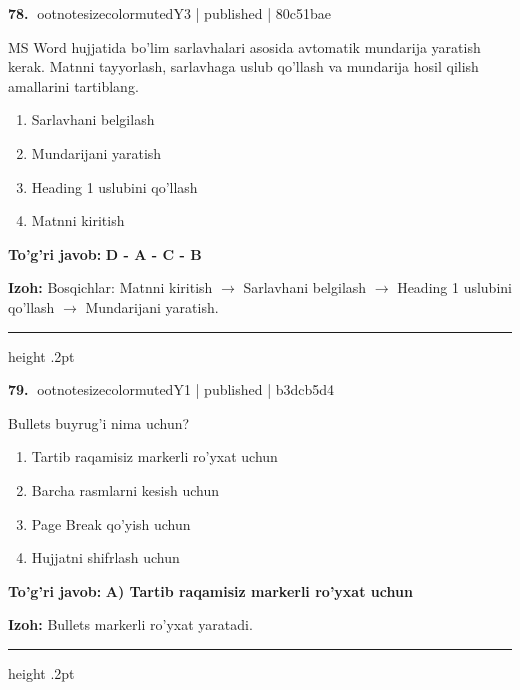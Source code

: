 \documentclass[10pt,a4paper]{article}
\begin{document}
\textbf{\color{ink}78.} {ootnotesizecolor{muted}Y3 | published | 80c51bae}
\par
MS Word hujjatida bo'lim sarlavhalari asosida avtomatik mundarija yaratish kerak. Matnni tayyorlash, sarlavhaga uslub qo'llash va mundarija hosil qilish amallarini tartiblang.
\begin{enumerate}[label=\Alph*),leftmargin=9mm]
\item Sarlavhani belgilash
\item Mundarijani yaratish
\item Heading 1 uslubini qo'llash
\item Matnni kiritish
\end{enumerate}
\begin{tcolorbox}[enhanced,breakable,colback=teal!4,colframe=teal!55!black,boxrule=0.45pt,arc=1.2mm,left=2.8mm,right=2.8mm,top=2mm,bottom=2mm]
\textbf{\color{teal}To'g'ri javob:} \textbf{D - A - C - B}
\par\smallskip
\textbf{Izoh:} Bosqichlar: Matnni kiritish \ensuremath{\rightarrow} Sarlavhani belgilash \ensuremath{\rightarrow} Heading 1 uslubini qo'llash \ensuremath{\rightarrow} Mundarijani yaratish.
\end{tcolorbox}
\vspace{2mm}\hrule height .2pt\vspace{2mm}

\textbf{\color{ink}79.} {ootnotesizecolor{muted}Y1 | published | b3dcb5d4}
\par
Bullets buyrug'i nima uchun?
\begin{enumerate}[label=\Alph*),leftmargin=9mm]
\item Tartib raqamisiz markerli ro'yxat uchun
\item Barcha rasmlarni kesish uchun
\item Page Break qo'yish uchun
\item Hujjatni shifrlash uchun
\end{enumerate}
\begin{tcolorbox}[enhanced,breakable,colback=teal!4,colframe=teal!55!black,boxrule=0.45pt,arc=1.2mm,left=2.8mm,right=2.8mm,top=2mm,bottom=2mm]
\textbf{\color{teal}To'g'ri javob:} \textbf{A) Tartib raqamisiz markerli ro'yxat uchun}
\par\smallskip
\textbf{Izoh:} Bullets markerli ro'yxat yaratadi.
\end{tcolorbox}
\vspace{2mm}\hrule height .2pt\vspace{2mm}
\end{document}
